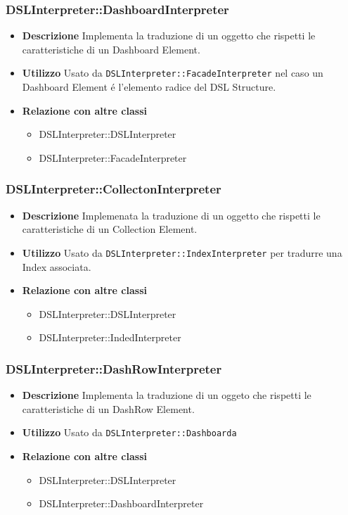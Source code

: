 \subsubsection{DSLInterpreter::DashboardInterpreter}
\begin{itemize}
\item \textbf{Descrizione}
Implementa la traduzione di un oggetto che rispetti le caratteristiche di un Dashboard Element.
\item \textbf{Utilizzo}
Usato da \texttt{DSLInterpreter::FacadeInterpreter} nel caso un Dashboard Element \'e l'elemento radice del DSL Structure. 
\item \textbf{Relazione con altre classi}
\begin{itemize}
\item DSLInterpreter::DSLInterpreter
\item DSLInterpreter::FacadeInterpreter
\end{itemize}
\end{itemize}

\subsubsection{DSLInterpreter::CollectonInterpreter}
\begin{itemize}
\item \textbf{Descrizione}
Implemenata la traduzione di un oggetto che rispetti le caratteristiche di un Collection Element.
\item \textbf{Utilizzo}
Usato da \texttt{DSLInterpreter::IndexInterpreter} per tradurre una Index associata.
\item \textbf{Relazione con altre classi}
\begin{itemize}
\item DSLInterpreter::DSLInterpreter
\item DSLInterpreter::IndedInterpreter
\end{itemize}
\end{itemize}

\subsubsection{DSLInterpreter::DashRowInterpreter}
\begin{itemize}
\item \textbf{Descrizione}
Implementa la traduzione di un oggeto che rispetti le caratteristiche di un DashRow Element.
\item \textbf{Utilizzo}
Usato da \texttt{DSLInterpreter::Dashboarda}
\item \textbf{Relazione con altre classi}
\begin{itemize}
\item DSLInterpreter::DSLInterpreter
\item DSLInterpreter::DashboardInterpreter 
\end{itemize}
\end{itemize}
